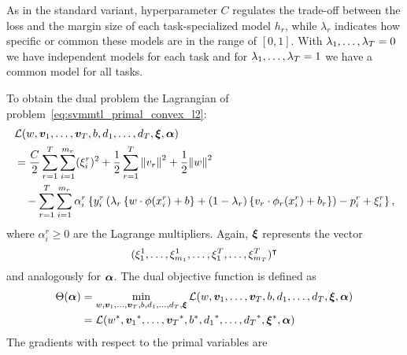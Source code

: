 As in the standard variant, hyperparameter $C$ regulates the trade-off between the loss and the margin size of each task-specialized model $h_r$, while $\lambda_r$ indicates how specific or common these models are in the range of $[0, 1]$. With $\lambda_1, \ldots, \lambda_T=0$ we have independent models for each task and for $\lambda_1, \ldots, \lambda_T=1$ we have a common model for all tasks. 
 


 To obtain the dual problem the Lagrangian of problem~\eqref{eq:svmmtl_primal_convex_l2}:
\begin{equation}\label{eq:svmmtl_lagrangian_convex_l2}
    \begin{aligned}
        & \lagr({w}, \fv{v}_1, \ldots, \fv{v}_\ntasks, b, d_1, \ldots, d_\ntasks, \fv{\xi}, \fv{\alpha}) \\
        &=  \frac{C}{2} \sum_{r= 1}^T \sum_{i=1}^{m_r} ({\xi_{i}^r})^2 + \frac{1}{2} \sum_{r= 1}^T{\norm{{v}_r}^2} + \frac{1}{2} {\norm{{w}}}^2 \\
        &\quad -  \sum_{r= 1}^T \sum_{i=1}^{m_r} \alpha_i^r \left\lbrace y_{i}^r  \left(\lambda_r \left\lbrace {w} \cdot \phi(x_{i}^r) + b  \right\rbrace + (1 - \lambda_r) \left\lbrace {v}_r \cdot \phi_r(x_{i}^r) + b_r \right\rbrace  \right) - p_{i}^r + \xi_{i}^r  \right\rbrace ,
    \end{aligned}
\end{equation}
where $\alpha_i^r \geq 0$ are the Lagrange multipliers. Again, $\bm{\xi}$ represents the vector $$(\xi_1^1, \ldots, \xi_{m_1}^1, \ldots, \xi_1^T, \ldots, \xi_{m_T}^T)^\intercal$$ and analogously for $\bm{\alpha}$. The dual objective function is defined as 
\begin{equation}\nonumber
    \begin{aligned}
         \Theta(\bm{\alpha}) &=  \min_{{w}, \bm{v}_1, \ldots, \bm{v}_T, b, d_1, \ldots, d_T, \bm{\xi}} \mathcal{L}({w}, \bm{v}_1, \ldots, \bm{v}_T, b, d_1, \ldots, d_T, \bm{\xi}, \bm{\alpha}) \\
         &= \mathcal{L}({{w}}^*, {\bm{v}_1}^*, \ldots, {\bm{v}_T}^*, {b}^*, {d_1}^*, \ldots, {d_T}^*, {\bm{\xi}}^*, \bm{\alpha})
    \end{aligned}    
\end{equation}
The gradients with respect to the primal variables are
